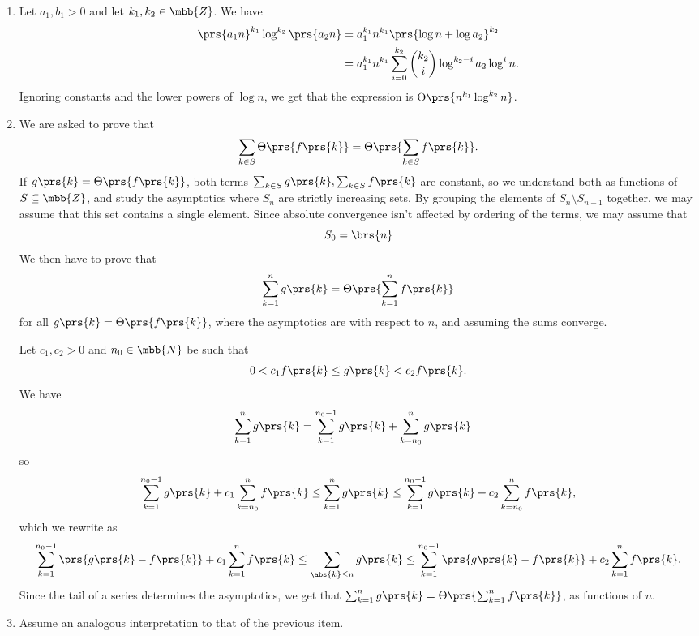 \documentclass[oneside]{scrbook}
\theoremstyle{definition}
\begin{document}
\begin{problem}
\begin{enumerate}[label = \alph*.]
    \item Let $a_1, b_1 > 0$ and let $k_1, k_2 \in \mbb{Z}$. We have
    \begin{align*}
        \prs{a_1 n}^{k_1} \log^{k_2}\prs{a_2 n} &= a_1^{k_1} n^{k_1} \prs{\log n + \log a_2}^{k_2}
        \\&= a_1^{k_1} n^{k_1} \sum_{i=0}^{k_2} \binom{k_2}{i} \log^{k_2 - i} a_2 \log^i n \text{.}
    \end{align*}
    Ignoring constants and the lower powers of $\log n$, we get that the expression is $\Theta\prs{n^{k_1} \log^{k_2} n}$.
    
    \item We are asked to prove that
    \[\sum_{k \in S} \Theta\prs{f\prs{k}} = \Theta\prs{\sum_{k \in S} f\prs{k}} \text{.}\]
    If $g\prs{k} = \Theta\prs{f\prs{k}}$, both terms
    $\sum_{k \in S} g\prs{k}, \sum_{k \in S} f\prs{k}$ are constant, so we understand both as functions of $S \subseteq \mbb{Z}$, and study the asymptotics where $S_n$ are strictly increasing sets. By grouping the elements of $S_n \setminus S_{n-1}$ together, we may assume that this set contains a single element. Since absolute convergence isn't affected by ordering of the terms, we may assume that \[S_0 = \brs{n}\]
    We then have to prove that
    \begin{align*}
        \sum_{k = 1}^n g\prs{k} = \Theta\prs{\sum_{k=1}^n f\prs{k}}
    \end{align*}
    for all $g\prs{k} = \Theta\prs{f\prs{k}}$, where the asymptotics are with respect to $n$, and assuming the sums converge.

    Let $c_1, c_2 > 0$ and $n_0 \in \mbb{N}$ be such that \[0 < c_1 f\prs{k} \leq g\prs{k} < c_2 f\prs{k} \text{.}\]
    We have
    \begin{align*}
        \sum_{k =1}^n g\prs{k} &= \sum_{k=1}^{n_0 - 1} g\prs{k} + \sum_{k=n_0}^n g\prs{k}
    \end{align*}
    so
    \begin{align*}
        \sum_{k=1}^{n_0 - 1} g\prs{k} + c_1 \sum_{k = n_0}^n f\prs{k} \leq \sum_{k=1}^n g\prs{k} \leq \sum_{k=1}^{n_0 - 1} g\prs{k} + c_2 \sum_{k = n_0}^n f\prs{k} \text{,}
    \end{align*}
    which we rewrite as
    \begin{align*}
        \sum_{k=1}^{n_0-1} \prs{g\prs{k}-f\prs{k}} + c_1 \sum_{k=1}^n f\prs{k} \leq \sum_{\abs{k} \leq n} g\prs{k} \leq \sum_{k=1}^{n_0-1} \prs{g\prs{k}-f\prs{k}} + c_2 \sum_{k=1}^n f\prs{k} \text{.}
    \end{align*}
    Since the tail of a series determines the asymptotics, we get that $\sum_{k=1}^{n} g\prs{k} = \Theta\prs{\sum_{k=1}^n f\prs{k}}$, as functions of $n$.
    \item Assume an analogous interpretation to that of the previous item.


\end{enumerate}
\end{problem}
\end{document}
